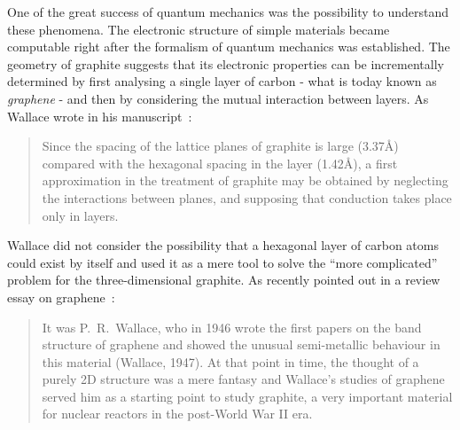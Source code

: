 \documentclass[draft,final]{vutinfth} %
\begin{document}
One of the great success of quantum mechanics was the possibility to understand these phenomena.
The electronic structure of simple materials became computable right after the formalism of quantum mechanics was established. 
The geometry of graphite suggests that its electronic properties can be incrementally determined by first analysing a single layer of carbon - what is today known as \textit{graphene} - and then by considering the mutual interaction between layers. As Wallace wrote in his manuscript~\cite{graphite1947}:
\begin{quote}
 Since the spacing of the lattice planes of graphite is large (3.37\AA) compared with the hexagonal spacing in the layer (1.42\AA), a first approximation in the treatment of graphite may be obtained by neglecting the interactions between planes, and supposing that conduction takes place only in layers.
\end{quote}
%
\noindent 
Wallace did not consider the possibility  that a hexagonal layer of carbon atoms could exist by itself and used it as a mere tool to solve the ``more complicated'' problem for the three-dimensional graphite. 
As recently pointed out in a review essay on graphene~\cite{graphene_review2009}:
\begin{quote}
 It was P.~R.~Wallace, who in 1946 wrote the first papers on the band structure of graphene and showed the unusual semi-metallic behaviour in this material (Wallace, 1947). At that point in time, the thought of a purely 2D structure was a mere fantasy and Wallace's studies of graphene served him as a starting point to study graphite, a very important material for nuclear reactors in the post-World War II era.
\end{quote}
%
\end{document}
